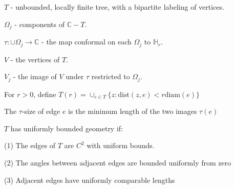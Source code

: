 \documentclass{beamer}
\begin{document}
\begin{frame}

$T$ - unbounded, locally finite tree, with a bipartite labeling of vertices.

$\Omega_j$ - components of $\mathbb{C}-T$.

$\tau: \cup \Omega_j \rightarrow \mathbb{C}$ - the map conformal on each $\Omega_j$ to $\mathbb{H}_r$.

$V$ - the vertices of $T$. 

$V_j$ - the image of $V$ under $\tau$ restricted to $\Omega_j$.

For $r > 0$, define $T(r) = \cup_{e\in T} \{z : \textrm{dist}(z,e) < r\textrm{diam}(e) \}$

The $\tau$-size of edge $e$ is the minimum length of the two images $\tau(e)$

\vspace{5mm}

$T$ has uniformly bounded geometry if: 

\hspace{5mm} (1) The edges of $T$ are $C^2$ with uniform bounds. 

\hspace{5mm} (2) The angles between adjacent edges are bounded uniformly from zero

\hspace{5mm} (3) Adjacent edges have uniformly comparable lengths

\end{frame}
\end{document}
